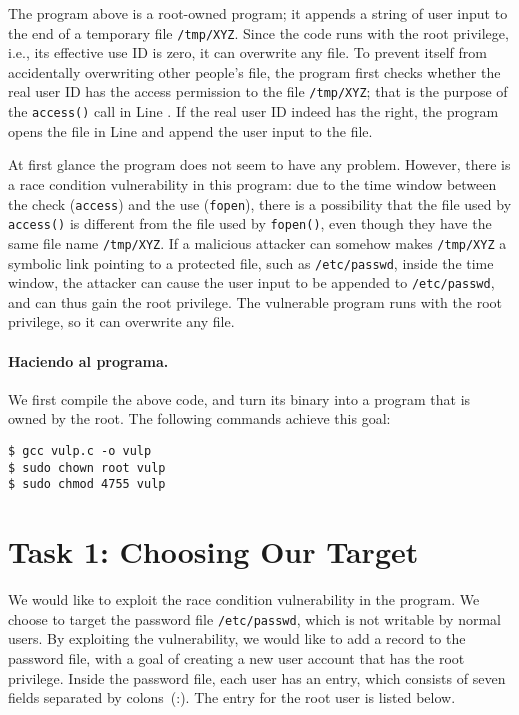 The program above is a root-owned \setuid program;
it appends a string of user input to
the end of a temporary file {\tt /tmp/XYZ}. Since the code runs
with the root privilege, i.e., its effective use ID is zero, it 
can overwrite any file. To prevent itself from accidentally
overwriting other people's file, the program first 
checks whether the real user ID has the access permission to the file
{\tt /tmp/XYZ}; that is the purpose of the {\tt access()} call in Line
.  If the real user ID indeed has 
the right, the program opens the file in Line  and append the user
input to the file. 

At first glance the program does not seem to have any problem.
However, there is a race condition vulnerability in this program: due to the 
time window between the check ({\tt access}) and 
the use ({\tt fopen}), there is a possibility that the file used by
{\tt access()} is different from the file used by {\tt fopen()}, even
though they have the same file name {\tt /tmp/XYZ}.  If a malicious 
attacker can somehow makes {\tt /tmp/XYZ} a symbolic link pointing to
a protected file, such as \texttt{/etc/passwd}, inside the time window, 
the attacker can cause the user input
to be appended to \texttt{/etc/passwd}, and can thus gain the root
privilege. The vulnerable program runs with the root privilege, so
it can overwrite any file.


\paragraph{Haciendo \setuid al programa.}
We first compile the above code, and turn its binary into a \setuid program that is owned by the
root. The following commands achieve this goal:

\begin{lstlisting}
$ gcc vulp.c -o vulp
$ sudo chown root vulp
$ sudo chmod 4755 vulp
\end{lstlisting}



\section{Task 1: Choosing Our Target}

We would like to exploit the race condition vulnerability in
the program.
We choose to target the password file \texttt{/etc/passwd}, which is not writable by
normal users. By exploiting the vulnerability, we would like to
add a record to the password file, with a goal of
creating a new user account that has the root privilege.
Inside the password file, each user has an entry, which consists of seven fields
separated by colons~(:). The entry for the root user is listed below.

